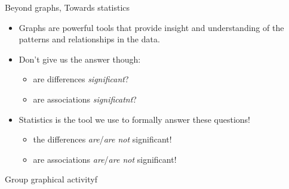 \documentclass[ignorenonframetext,t]{beamer}
\providecommand{\tightlist}{%
  \setlength{\itemsep}{0pt}\setlength{\parskip}{0pt}}
\begin{document}
\begin{frame}{Beyond graphs, Towards statistics}

\begin{itemize}
\item
  Graphs are powerful tools that provide insight and understanding of
  the patterns and relationships in the data.
\item
  Don't give us the answer though:

  \begin{itemize}
  \tightlist
  \item
    are differences \emph{significant}?
  \item
    are associations \emph{significatnt}?
  \end{itemize}
\item
  Statistics is the tool we use to formally answer these questions!

  \begin{itemize}
  \tightlist
  \item
    the differences \emph{are}/\emph{are not} significant!
  \item
    are associations \emph{are}/\emph{are not} significant!
  \end{itemize}
\end{itemize}

\end{frame}

\begin{frame}{Group graphical activityf}

\end{frame}
\end{document}
